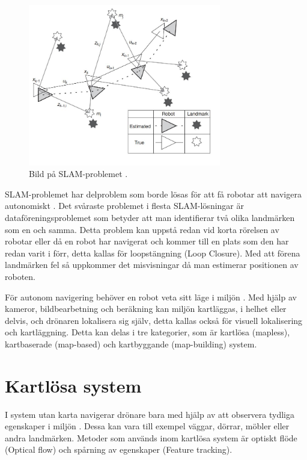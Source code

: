 \begin{figure}[ht]
    \begin{center}
    \includegraphics[width=0.75\textwidth]{slam-problem.JPG}
    \caption{Bild på SLAM-problemet \citep{realslamproblem}.}
    \label{slam-problemet}
    \end{center}
\end{figure}

SLAM-problemet har delproblem som borde lösas för att få robotar att navigera autonomiskt \citep{slamproblem}. Det svåraste problemet i flesta SLAM-lösningar är dataföreningsproblemet som betyder att man identifierar två olika landmärken som en och samma. Detta problem kan uppstå redan vid korta rörelsen av robotar eller då en robot har navigerat och kommer till en plats som den har redan varit i förr, detta kallas för loopstängning (Loop Closure). Med att förena landmärken fel så uppkommer det misvisningar då man estimerar positionen av roboten.

För autonom navigering behöver en robot veta sitt läge i miljön \citep{geospatial}. Med hjälp av kameror, bildbearbetning och beräkning kan miljön kartläggas, i helhet eller delvis, och drönaren lokalisera sig själv, detta kallas också för visuell lokalisering och kartläggning. Detta kan delas i tre kategorier, som är kartlösa (mapless), kartbaserade (map-based) och kartbyggande (map-building) system. 

\section{Kartlösa system}

I system utan karta navigerar drönare bara med hjälp av att observera tydliga egenskaper i miljön \citep{982903}. Dessa kan vara till exempel väggar, dörrar, möbler eller andra landmärken. Metoder som används inom kartlösa system är optiskt flöde (Optical flow) och spårning av egenskaper (Feature tracking). 

